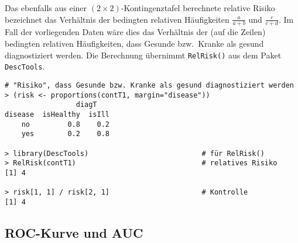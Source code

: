 Das ebenfalls aus einer $(2 \times 2)$-Kontingenztafel berechnete relative Risiko bezeichnet das Verhältnis der bedingten relativen Häufigkeiten $\frac{a}{a+b}$ und $\frac{c}{c+d}$. Im Fall der vorliegenden Daten wäre dies das Verhältnis der (auf die Zeilen) bedingten relativen Häufigkeiten, dass Gesunde bzw.\ Kranke als gesund diagnostiziert werden. Die Berechnung übernimmt  \lstinline!RelRisk()! aus dem Paket \lstinline!DescTools!.
\begin{lstlisting}
# "Risiko", dass Gesunde bzw. Kranke als gesund diagnostiziert werden
> (risk <- proportions(contT1, margin="disease"))
                 diagT
disease  isHealthy  isIll
    no         0.8    0.2
    yes        0.2    0.8

> library(DescTools)                           # für RelRisk()
> RelRisk(contT1)                              # relatives Risiko
[1] 4

> risk[1, 1] / risk[2, 1]                      # Kontrolle
[1] 4
\end{lstlisting}

\subsection{ROC-Kurve und AUC}
\label{sec:rocAuc}

